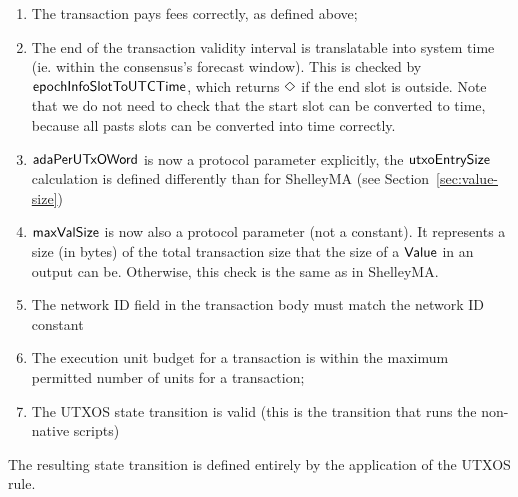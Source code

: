 \begin{enumerate}
  \item The transaction pays fees correctly, as defined above;

  \item The end of the transaction validity interval is translatable into
  system time (ie. within the consensus's forecast window). This is checked
  by $\mathsf{epochInfoSlotToUTCTime}$, which returns $\Diamond$ if the end slot is outside.
  Note that we do not need to check that the start slot can be converted to
  time, because all pasts slots can be converted into time correctly.

  \item $\mathsf{adaPerUTxOWord}$ is now a protocol parameter explicitly, the
  $\mathsf{utxoEntrySize}$ calculation is defined differently than for ShelleyMA
  (see Section~\ref{sec:value-size})

  \item $\mathsf{maxValSize}$ is now also a protocol parameter (not a constant).
  It represents a size (in bytes) of the total transaction
  size that the size of a $\mathsf{Value}$ in an output can be. Otherwise, this check is
  the same as in ShelleyMA.

  \item The network ID field in the transaction body must match the
  network ID constant

 \item The execution unit budget for a transaction is within the maximum
  permitted number of units for a transaction;

  \item The UTXOS state transition is valid (this is the transition that runs the
  non-native scripts)
\end{enumerate}

The resulting state transition is defined entirely by the application of the
UTXOS rule.

